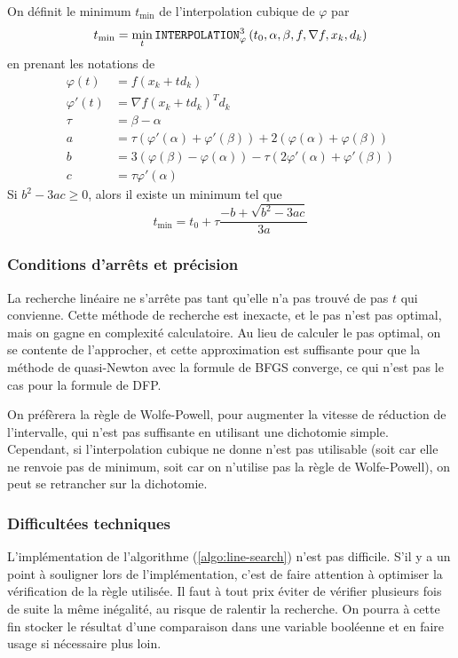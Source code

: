 \documentclass[3p, twocolumn]{elsarticle}
\begin{document}
On définit le minimum $t_{\min}$ de l'interpolation cubique de $\varphi$ par 
\[t_{\min} = \underset{t}\min\, \textrm{\texttt{INTERPOLATION}}^3_{\varphi}\left(t_0, \alpha, \beta, f, \nabla f, x_k, d_k\right)\]
 en prenant les notations de \cite{poly:mottelet2003}
\begin{align*}
    \varphi(t) &= f(x_k+td_k)\\
    \varphi'(t) &= \nabla f(x_k+td_k)^Td_k\\
    \tau &= \beta-\alpha\\
    a &= \tau(\varphi'(\alpha)+\varphi'(\beta))+2(\varphi(\alpha)+\varphi(\beta))\\
    b &= 3(\varphi(\beta)-\varphi(\alpha))-\tau(2\varphi'(\alpha)+\varphi'(\beta))\\
    c &= \tau\varphi'(\alpha)
\end{align*}
Si $b^2-3ac \geq 0$, alors il existe un minimum tel que 
\begin{equation}
    t_{\min} = t_0 + \tau\frac{-b+\sqrt{b^2-3ac}}{3a}
    \label{eq:min-interp-3}
\end{equation}
\subsubsection{Conditions d'arrêts et précision}
La recherche linéaire ne s'arrête pas tant qu'elle n'a pas trouvé de pas $t$ qui convienne. Cette méthode de recherche est inexacte, et le pas n'est pas optimal, mais on gagne en complexité calculatoire. Au lieu de calculer le pas optimal, on se contente de l'approcher, et cette approximation est suffisante pour que la méthode de quasi-Newton avec la formule de BFGS converge, ce qui n'est pas le cas pour la formule de DFP.

On préfèrera la règle de Wolfe-Powell, pour augmenter la vitesse de réduction de l'intervalle, qui n'est pas suffisante en utilisant une dichotomie simple. Cependant, si l'interpolation cubique ne donne n'est pas utilisable (soit car elle ne renvoie pas de minimum, soit car on n'utilise pas la règle de Wolfe-Powell), on peut se retrancher sur la dichotomie.

\subsubsection{Difficultées techniques}
L'implémentation de l'algorithme (\ref{algo:line-search}) n'est pas difficile. S'il y a un point à souligner lors de l'implémentation, c'est de faire attention à optimiser la vérification de la règle utilisée. Il faut à tout prix éviter de vérifier plusieurs fois de suite la même inégalité, au risque de ralentir la recherche. On pourra à cette fin stocker le résultat d'une comparaison dans une variable booléenne et en faire usage si nécessaire plus loin.
\end{document}
